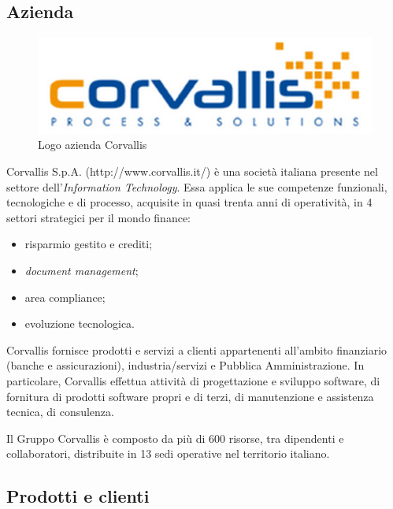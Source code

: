 \subsection{Azienda}
\label{1.1}

\begin{figure}[h!]
\centering
\includegraphics[scale=0.75]{../Logo&Header/logoCorvallis.png}
\caption{ Logo azienda Corvallis}
\end{figure}

Corvallis S.p.A. (http://www.corvallis.it/) è una società italiana presente nel settore dell’\emph{Information Technology}. Essa applica le sue competenze funzionali, tecnologiche e di processo, acquisite in quasi trenta anni di operatività, in 4 settori strategici per il mondo finance:
\begin{itemize}

\item risparmio gestito e crediti;
\item \emph{document management};
\item area compliance;
\item evoluzione tecnologica.\\
\end{itemize}

Corvallis fornisce prodotti e servizi a clienti appartenenti all'ambito finanziario (banche e assicurazioni), industria/servizi e Pubblica Amministrazione. In particolare, Corvallis effettua attività di progettazione e sviluppo software, di fornitura di prodotti software propri e di terzi, di manutenzione e assistenza tecnica, di consulenza.

Il Gruppo Corvallis è composto da più di 600 risorse, tra dipendenti e collaboratori, distribuite in 13 sedi operative nel territorio italiano.

\subsection{Prodotti e clienti}
\label{1.2}
